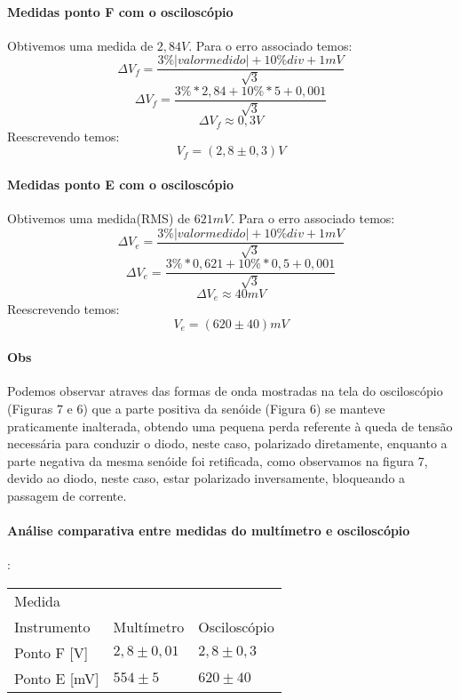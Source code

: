     \paragraph{Medidas ponto F com o osciloscópio}
    Obtivemos uma medida de $2,84V$. 
    Para o erro associado temos:
    $$\Delta V_f = \frac{3\% |valor medido| + 10\% div + 1mV}{\sqrt{3}}$$
    $$\Delta V_f = \frac{3\% * 2,84 + 10\% * 5 + 0,001}{\sqrt{3}}$$ 
    $$\Delta V_f \approx 0,3 V$$
    Reescrevendo temos: 
    $$V_f = (2,8\pm0,3) V$$

     \paragraph{Medidas ponto E com o osciloscópio}
    Obtivemos uma medida(RMS) de $621mV$.
    Para o erro associado temos:
    $$\Delta V_e = \frac{3\% |valor medido| + 10\% div + 1mV}{\sqrt{3}}$$
    $$\Delta V_e = \frac{3\% * 0,621 + 10\% * 0,5 + 0,001}{\sqrt{3}}$$
    $$\Delta V_e \approx 40 mV$$
    Reescrevendo temos: 
    $$V_e = (620\pm40) mV$$

    \paragraph{Obs} 
    Podemos observar atraves das formas de onda 
    mostradas na tela do osciloscópio 
    (Figuras 7 e 6) que a parte positiva da 
    senóide (Figura 6) se manteve praticamente 
    inalterada, obtendo uma pequena perda 
    referente à queda de tensão necessária 
    para conduzir o diodo, neste caso, 
    polarizado diretamente, enquanto a parte 
    negativa da mesma senóide foi retificada, 
    como observamos na figura 7, devido ao 
    diodo, neste caso, estar polarizado 
    inversamente, bloqueando a passagem de 
    corrente.

    \paragraph{Análise comparativa entre medidas do multímetro e osciloscópio}:


    \begin{tabular}{ | l | l l | }
    \hline 
    Medida\\Instrumento & Multímetro    & Osciloscópio \\ \hline
    Ponto F [V]         & $2,8\pm0,01$  & $2,8\pm0,3$ \\
    Ponto E [mV]        & $554\pm5$     & $620\pm40$ \\
    \hline
    \end{tabular}
    \newline 

